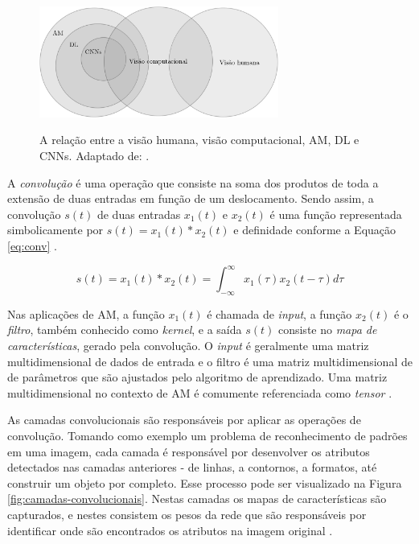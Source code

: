 \begin{figure}[h!]
  \centering
  \caption{A relação entre a visão humana, visão computacional, AM, DL e CNNs. Adaptado de: \cite{khan}.}
  \includegraphics[width=0.7\textwidth]{imgs/areas-ia}
  \label{fig:areas-ia}
\end{figure}

A \emph{convolução} é uma operação que consiste na soma dos produtos de toda a extensão de duas entradas em função de um deslocamento. Sendo assim, a convolução $s(t)$ de duas entradas $x_1(t)$ e $x_2(t)$ é uma função representada simbolicamente por $s(t) = x_1(t) * x_2(t)$ e definidade conforme a Equação \ref{eq:conv} \cite{lathi}.

\begin{equation}
  \label{eq:conv}
  s(t) = x_1(t) * x_2(t) = \int_{-\infty}^{\infty} x_1(\tau)x_2(t - \tau)d\tau
\end{equation}

Nas aplicações de AM, a função $x_1(t)$ é chamada de \emph{input}, a função $x_2(t)$ é o \emph{filtro}, também conhecido como \emph{kernel}, e a saída $s(t)$ consiste no \emph{mapa de características}, gerado pela convolução. O \emph{input} é geralmente uma matriz multidimensional de dados de entrada e o filtro é uma matriz multidimensional de de parâmetros que são ajustados pelo algoritmo de aprendizado. Uma matriz multidimensional no contexto de AM é comumente referenciada como \emph{tensor} \cite{goodfellow}.

As camadas convolucionais são responsáveis por aplicar as operações de convolução. Tomando como exemplo um problema de reconhecimento de padrões em uma imagem, cada camada é responsável por desenvolver os atributos detectados nas camadas anteriores - de linhas, a contornos, a formatos, até construir um objeto por completo. Esse processo pode ser visualizado na Figura \ref{fig:camadas-convolucionais}. Nestas camadas os mapas de características são capturados, e nestes consistem os pesos da rede que são responsáveis por identificar onde são encontrados os atributos na imagem original \cite{buduma}.

